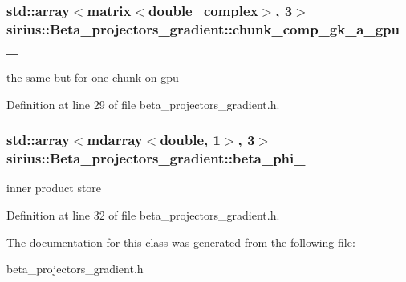 \subsubsection[{chunk\+\_\+comp\+\_\+gk\+\_\+a\+\_\+gpu\+\_\+}]{\setlength{\rightskip}{0pt plus 5cm}std\+::array$<${\bf matrix}$<$double\+\_\+complex$>$, 3$>$ sirius\+::\+Beta\+\_\+projectors\+\_\+gradient\+::chunk\+\_\+comp\+\_\+gk\+\_\+a\+\_\+gpu\+\_\+\hspace{0.3cm}{\ttfamily [protected]}}\label{classsirius_1_1_beta__projectors__gradient_a08693b3d3b23dc8cae58f1a2f1d9b71d}


the same but for one chunk on gpu 



Definition at line 29 of file beta\+\_\+projectors\+\_\+gradient.\+h.

\hypertarget{classsirius_1_1_beta__projectors__gradient_ac80b7702e8eee3877608c77b87afa0ac}{}
\subsubsection[{beta\+\_\+phi\+\_\+}]{\setlength{\rightskip}{0pt plus 5cm}std\+::array$<${\bf mdarray}$<$double, 1$>$, 3$>$ sirius\+::\+Beta\+\_\+projectors\+\_\+gradient\+::beta\+\_\+phi\+\_\+\hspace{0.3cm}{\ttfamily [protected]}}\label{classsirius_1_1_beta__projectors__gradient_ac80b7702e8eee3877608c77b87afa0ac}


inner product store 



Definition at line 32 of file beta\+\_\+projectors\+\_\+gradient.\+h.



The documentation for this class was generated from the following file\+:\begin{DoxyCompactItemize}
\item 
beta\+\_\+projectors\+\_\+gradient.\+h\end{DoxyCompactItemize}
